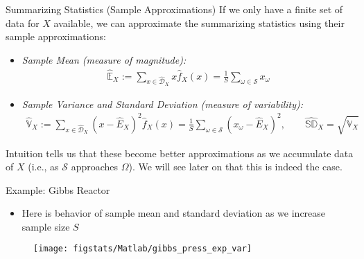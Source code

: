 \documentclass[9pt]{beamer}
\begin{document}
%
\begin{frame}{Summarizing Statistics (Sample Approximations)}
If we only have a finite set of data for $X$ available, we can approximate the summarizing statistics using their sample approximations: 
\begin{block}{}
\begin{itemize}
\item {\em Sample Mean (measure of magnitude):} 
\begin{align*}
\hat{\mathbb{E}}_X:=\sum_{x\in \hat{\mathcal{D}}_X}x\hat{f}_X(x)=\frac{1}{S}\sum_{\omega\in \mathcal{S}}x_\omega
\end{align*}
\item {\em Sample Variance and Standard Deviation (measure of variability):} 
\begin{align*}
\hat{\mathbb{V}}_X:=\sum_{x\in \hat{\mathcal{D}}_X}(x-\hat{E}_X)^2\hat{f}_X(x)=\frac{1}{S}\sum_{\omega\in \mathcal{S}}(x_\omega-\hat{E}_X)^2,\qquad \hat{\mathbb{SD}}_X=\sqrt{\hat{\mathbb{V}}_X}
\end{align*}
\end{itemize}
\end{block}
Intuition tells us that these become better approximations as we accumulate data of $X$ (i.e., as $\mathcal{S}$ approaches $\Omega$). We will see later on that this is indeed the case. 
\end{frame}

\begin{frame}{Example: Gibbs Reactor}
\begin{itemize}
\item Here is behavior of sample mean and standard deviation as we increase sample size $S$
\end{itemize}
\begin{figure}[!htb]
    \centering
	\texttt{[image: figstats/Matlab/gibbs\_press\_exp\_var]}
\end{figure}

\end{frame}
\end{document}
